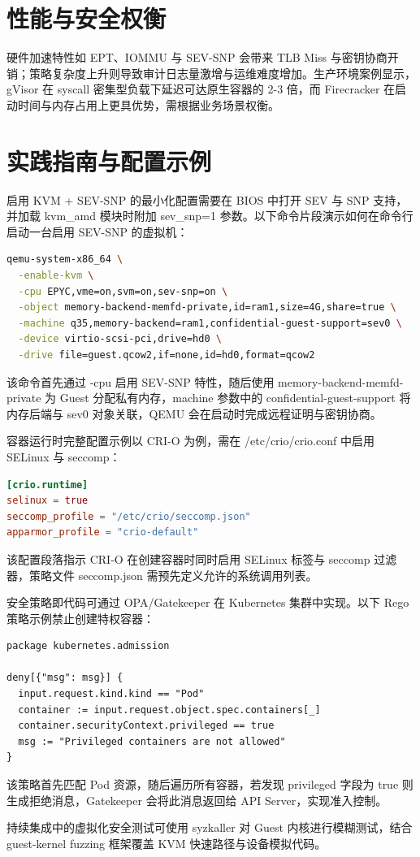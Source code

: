 \chapter{性能与安全权衡}
硬件加速特性如 EPT、IOMMU 与 SEV-SNP 会带来 TLB Miss 与密钥协商开销；策略复杂度上升则导致审计日志量激增与运维难度增加。生产环境案例显示，gVisor 在 syscall 密集型负载下延迟可达原生容器的 2-3 倍，而 Firecracker 在启动时间与内存占用上更具优势，需根据业务场景权衡。\par
\chapter{实践指南与配置示例}
启用 KVM + SEV-SNP 的最小化配置需要在 BIOS 中打开 SEV 与 SNP 支持，并加载 kvm\_{}amd 模块时附加 sev\_{}snp=1 参数。以下命令片段演示如何在命令行启动一台启用 SEV-SNP 的虚拟机：\par
\begin{lstlisting}[language=bash]
qemu-system-x86_64 \
  -enable-kvm \
  -cpu EPYC,vme=on,svm=on,sev-snp=on \
  -object memory-backend-memfd-private,id=ram1,size=4G,share=true \
  -machine q35,memory-backend=ram1,confidential-guest-support=sev0 \
  -device virtio-scsi-pci,drive=hd0 \
  -drive file=guest.qcow2,if=none,id=hd0,format=qcow2
\end{lstlisting}
该命令首先通过 -cpu 启用 SEV-SNP 特性，随后使用 memory-backend-memfd-private 为 Guest 分配私有内存，machine 参数中的 confidential-guest-support 将内存后端与 sev0 对象关联，QEMU 会在启动时完成远程证明与密钥协商。\par
容器运行时完整配置示例以 CRI-O 为例，需在 /etc/crio/crio.conf 中启用 SELinux 与 seccomp：\par
\begin{lstlisting}[language=toml]
[crio.runtime]
selinux = true
seccomp_profile = "/etc/crio/seccomp.json"
apparmor_profile = "crio-default"
\end{lstlisting}
该配置段落指示 CRI-O 在创建容器时同时启用 SELinux 标签与 seccomp 过滤器，策略文件 seccomp.json 需预先定义允许的系统调用列表。\par
安全策略即代码可通过 OPA/Gatekeeper 在 Kubernetes 集群中实现。以下 Rego 策略示例禁止创建特权容器：\par
\begin{lstlisting}[language=rego]
package kubernetes.admission

deny[{"msg": msg}] {
  input.request.kind.kind == "Pod"
  container := input.request.object.spec.containers[_]
  container.securityContext.privileged == true
  msg := "Privileged containers are not allowed"
}
\end{lstlisting}
该策略首先匹配 Pod 资源，随后遍历所有容器，若发现 privileged 字段为 true 则生成拒绝消息，Gatekeeper 会将此消息返回给 API Server，实现准入控制。\par
持续集成中的虚拟化安全测试可使用 syzkaller 对 Guest 内核进行模糊测试，结合 guest-kernel fuzzing 框架覆盖 KVM 快速路径与设备模拟代码。\par

